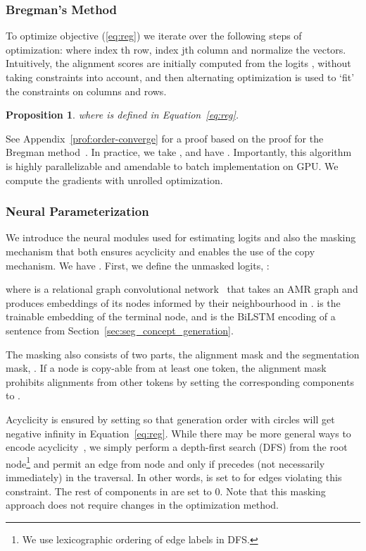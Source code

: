 \documentclass[11pt]{article}
\newtheorem{prop}{Proposition}
\begin{document}
\subsubsection{Bregman's Method}
To optimize objective (\ref{eq:reg}) we iterate over the following steps of optimization: 
where   index th row,  index jth column and  normalize the vectors. Intuitively, the alignment scores are initially computed from the logits , without taking constraints into account, and then alternating optimization is used to `fit' the constraints on columns and rows.



\begin{prop}\label{prop:order-converge}
 where  is defined in Equation~\ref{eq:reg}.
\end{prop}
See Appendix~\ref{prof:order-converge} for a proof based on the proof for the Bregman method~\cite{Bregman1967TheRM}. In practice, we take , and have . Importantly, this algorithm is highly parallelizable and amendable to batch implementation on GPU. We compute the gradients with unrolled optimization. 






\subsubsection{Neural Parameterization} \label{sec:mask}
We introduce the neural modules used for estimating logits  and also the masking mechanism that both ensures acyclicity and enables the use of the  copy mechanism. We have . First, we define the unmasked logits, :

where  is a relational graph convolutional network~\cite{Schlichtkrull2018ModelingRD} that takes  an AMR graph   and produces embeddings of its nodes informed by their neighbourhood in .   is the trainable embedding of the terminal node, and  is the BiLSTM encoding of a sentence from Section~\ref{sec:seg_concept_generation}.



The masking also consists of two parts, the alignment mask and the segmentation mask,  .
If a node is copy-able from at least one token, the alignment mask prohibits alignments from other tokens by setting the corresponding components  to . 

Acyclicity is ensured by setting  so that generation order with circles will get negative infinity in Equation~\ref{eq:reg}.
While there may be more general
ways to encode acyclicity~\cite{martins2009concise},
we simply perform a depth-first search (DFS) from the root node\footnote{We use
lexicographic ordering of edge labels in DFS.}
and permit an edge from node  and  only if  precedes  (not necessarily immediately) in the traversal. In other words,  
 is set to  for edges  violating this constraint.
The rest of components in  are set to 0. Note that this masking approach does not require changes in the optimization method.
\end{document}
